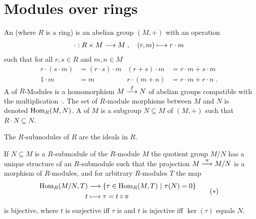 \documentclass[a4paper,parskip=half,numbers=enddot, DIV=12]{scrreprt}
\begin{document}
	\section{Modules over rings}
	\begin{defi}
		An  (where $R$ is a ring) is an abelian group $(M,+)$ with an operation
		\begin{align*}
		\cdot: R\times M \longrightarrow M\;,\quad  (r,m) \longmapsto r\cdot m
		\end{align*}
		such that for all $r,s\in R$ and $m,n\in M$
		\begin{align*}
		r\cdot(s\cdot m) &= (r\cdot s)\cdot m & (r+s)\cdot m &= r\cdot m + s\cdot m\\
		1\cdot m &= m & r\cdot(m+n)&= r\cdot m +r\cdot n\;. 
		\end{align*}
		A  of $R$-Modules is a homomorphism $M \morphism[f] N$ of abelian groups compatible with the multiplication $\cdot$. The set of $R$-module morphisms between $M$ and $N$ is denoted $\operatorname{Hom}_R(M,N)$. A  of $M$ is a subgroup $N\subseteq M$ of $(M,+)$ such that $R\cdot N \subseteq N$. 
	\end{defi}
	\begin{example} The $R$-submodules of $R$ are the ideals in $R$.
	\end{example}
	\begin{prop} 
		If $N\subseteq M$ is a $R$-submodule of the $R$-module $M$ the quotient group $M/N$ has a unique structure of an $R$-submodule such that the projection $M\morphism[\pi] M/N$ is a morphism of $R$-modules, and for arbitrary $R$-modules $T$ the map  
		\begin{align}\lbl{eq:M/NUniversalProp}
			\begin{split}
				\Hom_R(M/N, T) &\longto \left\{\tau\in \Hom_R(M,T)\st \tau(N) = 0\right\}\\
				t &\longmapsto \tau = t \circ \pi
			\end{split}\tag{$*$}
		\end{align}
		is bijective, where $t$ is surjective iff $\tau$ is and $t$ is injective iff $\ker(\tau)$ equals $N$.
	\end{prop}
\end{document}
